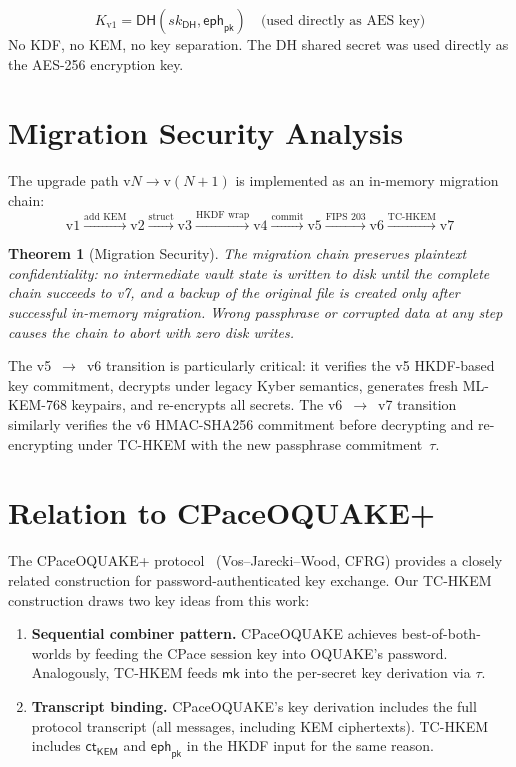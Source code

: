 \documentclass[11pt,a4paper]{article}
\newtheorem{theorem}{Theorem}[section]
\newcommand{\KEM}{\mathsf{KEM}}
\renewcommand{\DH}{\mathsf{DH}}
\newcommand{\mk}{\mathsf{mk}}
\newcommand{\ct}{\mathsf{ct}}
\newcommand{\eph}{\mathsf{eph}}
\begin{document}
\begin{equation}
K_{\mathrm{v1}} = \DH(sk_{\DH}, \eph_{\mathsf{pk}}) \quad\text{(used directly as AES key)}
\end{equation}
No KDF, no KEM, no key separation. The DH shared secret was used
directly as the AES-256 encryption key.

\section{Migration Security Analysis}\label{sec:migration}

The upgrade path $\mathrm{v}N \to \mathrm{v}(N{+}1)$ is implemented
as an in-memory migration chain:
\[
\mathrm{v1} \xrightarrow{\text{add KEM}} \mathrm{v2}
\xrightarrow{\text{struct}} \mathrm{v3}
\xrightarrow{\text{HKDF wrap}} \mathrm{v4}
\xrightarrow{\text{commit}} \mathrm{v5}
\xrightarrow{\text{FIPS 203}} \mathrm{v6}
\xrightarrow{\text{TC-HKEM}} \mathrm{v7}
\]

\begin{theorem}[Migration Security]
The migration chain preserves plaintext confidentiality:
no intermediate vault state is written to disk until the
complete chain succeeds to v7, and a backup of the original
file is created only after successful in-memory migration.
Wrong passphrase or corrupted data at any step causes the
chain to abort with zero disk writes.
\end{theorem}

The v5~$\to$~v6 transition is particularly critical: it verifies
the v5 HKDF-based key commitment, decrypts under legacy Kyber
semantics, generates fresh ML-KEM-768 keypairs, and re-encrypts
all secrets. The v6~$\to$~v7 transition similarly verifies the v6
HMAC-SHA256 commitment before decrypting and re-encrypting under
TC-HKEM with the new passphrase commitment~$\tau$.

\section{Relation to CPaceOQUAKE+}\label{sec:cpace}

The CPaceOQUAKE+ protocol~\cite{CPaceOQUAKE} (Vos--Jarecki--Wood, CFRG)
provides a closely related construction for password-authenticated key
exchange. Our TC-HKEM construction draws two key ideas from this work:

\begin{enumerate}[nosep]
\item \textbf{Sequential combiner pattern.} CPaceOQUAKE achieves
best-of-both-worlds by feeding the CPace session key into
OQUAKE's password. Analogously, TC-HKEM feeds $\mk$ into
the per-secret key derivation via $\tau$.

\item \textbf{Transcript binding.} CPaceOQUAKE's key derivation
includes the full protocol transcript (all messages, including
KEM ciphertexts). TC-HKEM includes $\ct_{\KEM}$ and
$\eph_{\mathsf{pk}}$ in the HKDF input for the same reason.
\end{enumerate}
\end{document}

